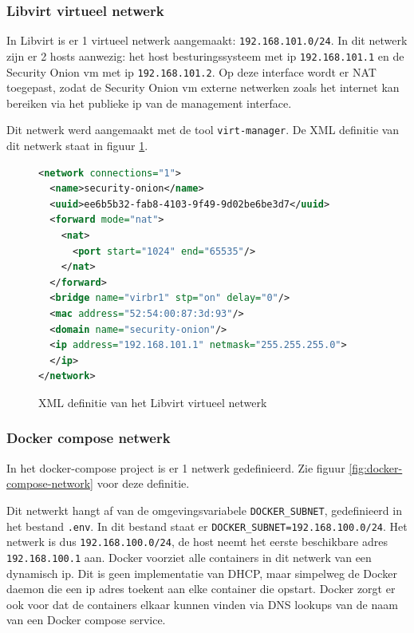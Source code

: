 \documentclass[a4paper,12pt]{report}
\begin{document}
\subsubsection{Libvirt virtueel netwerk}
In Libvirt is er 1 virtueel netwerk aangemaakt: \lstinline|192.168.101.0/24|.
In dit netwerk zijn er 2 hosts aanwezig: het host besturingssysteem met ip \lstinline|192.168.101.1| en de Security Onion vm met ip \lstinline|192.168.101.2|.
Op deze interface wordt er NAT toegepast, zodat de Security Onion vm externe netwerken zoals het internet kan bereiken via het publieke ip van de management interface.

Dit netwerk werd aangemaakt met de tool \lstinline|virt-manager|.
De XML definitie van dit netwerk staat in figuur \ref{fig:libvirt-network-xml}.

\begin{figure}[H]
  \begin{lstlisting}[language=XML]
<network connections="1">
  <name>security-onion</name>
  <uuid>ee6b5b32-fab8-4103-9f49-9d02be6be3d7</uuid>
  <forward mode="nat">
    <nat>
      <port start="1024" end="65535"/>
    </nat>
  </forward>
  <bridge name="virbr1" stp="on" delay="0"/>
  <mac address="52:54:00:87:3d:93"/>
  <domain name="security-onion"/>
  <ip address="192.168.101.1" netmask="255.255.255.0">
  </ip>
</network>
  \end{lstlisting}
  \caption{XML definitie van het Libvirt virtueel netwerk}
  \label{fig:libvirt-network-xml}
\end{figure}

\subsubsection{Docker compose netwerk}
In het docker-compose project is er 1 netwerk gedefinieerd.
Zie figuur \ref{fig:docker-compose-network} voor deze definitie.

Dit netwerkt hangt af van de omgevingsvariabele \lstinline|DOCKER_SUBNET|, gedefinieerd in het bestand \lstinline|.env|.
In dit bestand staat er \lstinline|DOCKER_SUBNET=192.168.100.0/24|.
Het netwerk is dus \lstinline|192.168.100.0/24|, de host neemt het eerste beschikbare adres \lstinline|192.168.100.1| aan.
Docker voorziet alle containers in dit netwerk van een dynamisch ip.
Dit is geen implementatie van DHCP, maar simpelweg de Docker daemon die een ip adres toekent aan elke container die opstart.
Docker zorgt er ook voor dat de containers elkaar kunnen vinden via DNS lookups van de naam van een Docker compose service. 
\end{document}
